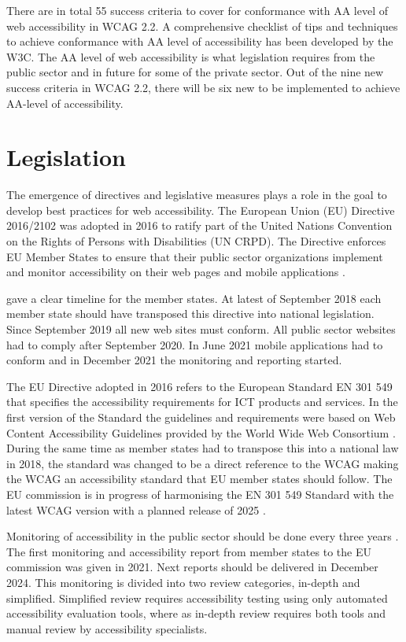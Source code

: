 There are in total 55 success criteria to cover for conformance with AA level of web accessibility in WCAG 2.2. A comprehensive checklist \citep{wcag_checklist} of tips and techniques to achieve conformance with AA level of accessibility has been developed by the W3C. The AA level of web accessibility is what legislation requires from the public sector and in future for some of the private sector.  Out of the nine new success criteria in WCAG 2.2, there will be six new to be implemented to achieve AA-level of accessibility.


\section{Legislation}

The emergence of directives and legislative measures plays a role in the goal to develop best practices for web accessibility. The European Union (EU) Directive 2016/2102 was adopted in 2016 to ratify part of the United Nations Convention on the Rights of Persons with Disabilities (UN CRPD). The Directive enforces EU Member States to ensure that their public sector organizations implement and monitor accessibility on their web pages and mobile applications \citep{eudirective2016}. 

\textcite{eudirective2016} gave a clear timeline for the member states. At latest of September 2018 each member state should have transposed this directive into national legislation. Since September 2019 all new web sites must conform. All public sector websites had to comply after September 2020. In June 2021 mobile applications had to conform and in December 2021 the monitoring and reporting started. 

The EU Directive adopted in 2016 refers to the European Standard EN 301 549 that specifies the accessibility requirements for ICT products and services. In the first version of the Standard the guidelines and requirements were based on Web Content Accessibility Guidelines provided by the World Wide Web Consortium \citep{wcagadoptioneurope}. During the same time as member states had to transpose this into a national law in 2018, the standard was changed to be a direct reference to the WCAG making the WCAG an accessibility standard that EU member states should follow. The EU commission is in progress of harmonising the EN 301 549 Standard with the latest WCAG version with a planned release of 2025 \citep{etsi_standard}.

Monitoring of accessibility in the public sector should be done every three years \citep{eudirectivemonitoring}. The first monitoring and accessibility report from member states to the EU commission was given in 2021. Next reports should be delivered in December 2024. This monitoring is divided into two review categories, in-depth and simplified. Simplified review requires accessibility testing using only automated accessibility evaluation tools, where as in-depth review requires both tools and manual review by accessibility specialists. 

